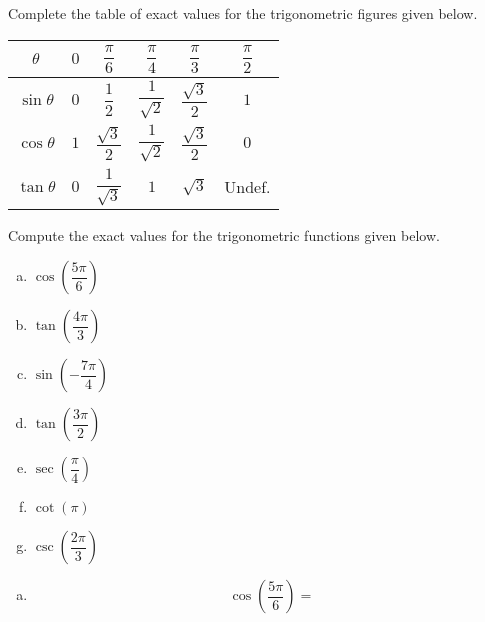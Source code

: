 \documentclass[12pt,letterpaper]{exam}
\begin{document}
\examtitle
{} 
\scores
\newpage

\begin{questions}

\newpage
\question[15] Complete the table of exact values for the trigonometric figures given below.
	{\def\arraystretch{3}
	\setlength{\tabcolsep}{2.5em}
	\begin{table}[!ht]
	\centering
	\begin{tabular}{|c||c|c|c|c|c|} \hline
	$\theta$ & $0$ & $\dfrac{\pi}{6}$ & $\dfrac{\pi}{4}$ & $\dfrac{\pi}{3}$ & $\dfrac{\pi}{2}$ \\ \hline \hline
	$\sin \theta$ & $0$ & $\dfrac{1}{2}$ & $\dfrac{1}{\sqrt{2}}$ & $\dfrac{\sqrt{3}}{2}$ & $1$ \\ \hline
	$\cos \theta$ & $1$ & $\dfrac{\sqrt{3}}{2}$ & $\dfrac{1}{\sqrt{2}}$ & $\dfrac{\sqrt{3}}{2}$ & $0$ \\ \hline
	$\tan \theta$ & $0$ & $\dfrac{1}{\sqrt{3}}$ & $1$ & $\sqrt{3}$ & Undef. \\ \hline
	\end{tabular}
	\end{table}
	}



\newpage
\question[15] Compute the exact values for the trigonometric functions given below.
	\begin{enumerate}[(a)]
	\item $\cos \!\left( \dfrac{5\pi}{6} \right)$
	\item $\tan \!\left( \dfrac{4\pi}{3} \right)$
	\item $\sin \!\left( -\dfrac{7\pi}{4} \right)$
	\item $\tan \!\left( \dfrac{3\pi}{2} \right)$
	\item $\sec \!\left( \dfrac{\pi}{4} \right)$
	\item $\cot \left( \pi \right)$
	\item $\csc \!\left( \dfrac{2\pi}{3} \right)$
	\end{enumerate} \pspace

{\itshape \sol
\begin{enumerate}[(a)]
\item 
	\[
	\cos \!\left( \dfrac{5\pi}{6} \right)= 
	\]


\end{enumerate}}
\end{questions}
\end{document}
